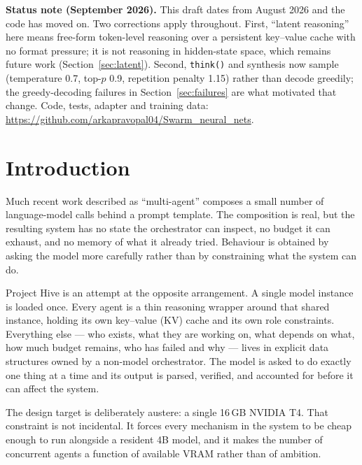\documentclass[11pt]{article}
\begin{document}
\noindent\textbf{Status note (September 2026).} This draft dates from August
2026 and the code has moved on. Two corrections apply throughout. First,
``latent reasoning'' here means free-form token-level reasoning over a
persistent key--value cache with no format pressure; it is not reasoning in
hidden-state space, which remains future work (Section~\ref{sec:latent}).
Second, \texttt{think()} and synthesis now sample (temperature 0.7, top-$p$
0.9, repetition penalty 1.15) rather than decode greedily; the greedy-decoding
failures in Section~\ref{sec:failures} are what motivated that change. Code,
tests, adapter and training data:
\url{https://github.com/arkapravopal04/Swarm_neural_nets}.


\section{Introduction}
\label{sec:intro}

Much recent work described as ``multi-agent'' composes a small number of
language-model calls behind a prompt template. The composition is real, but the
resulting system has no state the orchestrator can inspect, no budget it can
exhaust, and no memory of what it already tried. Behaviour is obtained by
asking the model more carefully rather than by constraining what the system can
do.

Project Hive is an attempt at the opposite arrangement. A single model instance
is loaded once. Every agent is a thin reasoning wrapper around that shared
instance, holding its own key--value (KV) cache and its own role constraints.
Everything else --- who exists, what they are working on, what depends on what,
how much budget remains, who has failed and why --- lives in explicit data
structures owned by a non-model orchestrator. The model is asked to do exactly
one thing at a time and its output is parsed, verified, and accounted for
before it can affect the system.

The design target is deliberately austere: a single 16\,GB NVIDIA T4. That
constraint is not incidental. It forces every mechanism in the system to be
cheap enough to run alongside a resident 4B model, and it makes the number of
concurrent agents a function of available VRAM rather than of ambition.
\end{document}
